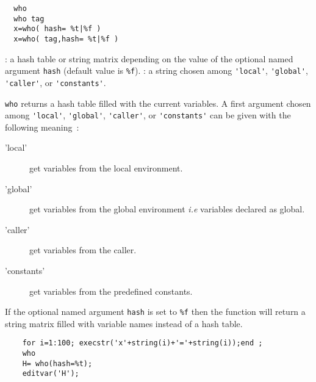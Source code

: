 \begin{mandesc}
\end{mandesc}

\begin{calling_sequence}
\begin{verbatim}
  who
  who tag 
  x=who( hash= %t|%f )
  x=who( tag,hash= %t|%f )
\end{verbatim}
\end{calling_sequence}
\begin{parameters}
  \begin{varlist}
    : a hash table or string matrix depending on the value of 
    the optional named argument \verb+hash+ (default value is \verb+%f+).
    : a string chosen among \verb+'local'+,  \verb+'global'+,
    \verb+'caller'+, or  \verb+'constants'+.
  \end{varlist}
\end{parameters}
\begin{mandescription}
  \verb!who! returns a hash table filled with the current variables. 
  A first argument chosen among \verb+'local'+,  \verb+'global'+,
  \verb+'caller'+, or  \verb+'constants'+ can be given with the following 
  meaning~:
\begin{description}
  \item['local'] get variables from the local environment. 
  \item['global'] get variables from the global environment \emph{i.e} 
    variables declared as global.
  \item['caller'] get variables from the caller. 
  \item['constants'] get variables from the predefined constants. 
\end{description}
  If the optional 
  named argument \verb+hash+ is set to \verb+%f+ then the function will 
  return a string matrix filled with variable names instead of a hash table.
\end{mandescription} 
\begin{examples}
  \begin{Verbatim} 
    for i=1:100; execstr('x'+string(i)+'='+string(i));end ;
    who 
    H= who(hash=%t);
    editvar('H');
  \end{Verbatim}
\end{examples}




